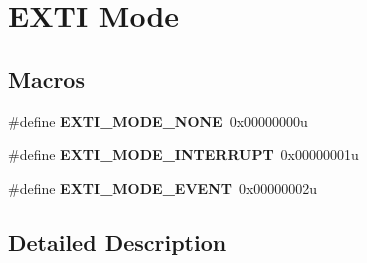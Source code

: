 \hypertarget{group___e_x_t_i___mode}{}\section{E\+X\+TI Mode}
\label{group___e_x_t_i___mode}
\subsection*{Macros}
\begin{DoxyCompactItemize}
\item 
\mbox{\label{group___e_x_t_i___mode_ga9b50ed09da5b1dd0619d8792f142b049}} 
\#define {\bfseries E\+X\+T\+I\+\_\+\+M\+O\+D\+E\+\_\+\+N\+O\+NE}~0x00000000u
\item 
\mbox{\label{group___e_x_t_i___mode_gae1e032ec592296be21f416a79a44f4f5}} 
\#define {\bfseries E\+X\+T\+I\+\_\+\+M\+O\+D\+E\+\_\+\+I\+N\+T\+E\+R\+R\+U\+PT}~0x00000001u
\item 
\mbox{\label{group___e_x_t_i___mode_ga672fef88f86b5d8a421194e3dac0f2e1}} 
\#define {\bfseries E\+X\+T\+I\+\_\+\+M\+O\+D\+E\+\_\+\+E\+V\+E\+NT}~0x00000002u
\end{DoxyCompactItemize}


\subsection{Detailed Description}
